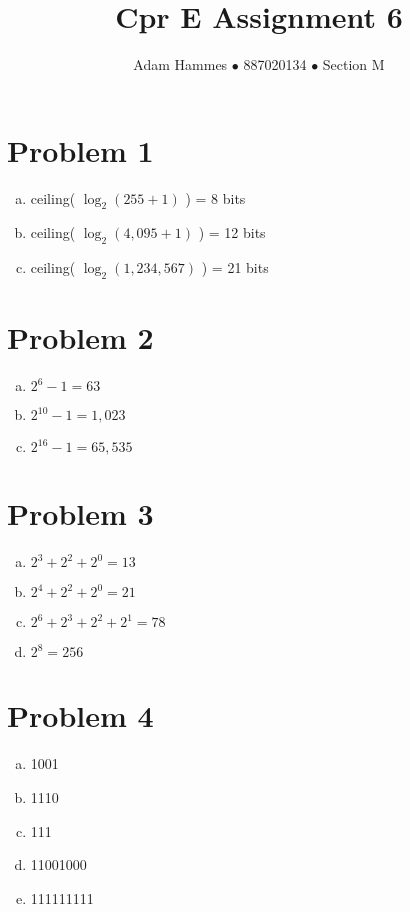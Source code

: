 \documentclass[11pt]{article}
\begin{document}
\title{Cpr E Assignment 6}
\author{Adam Hammes $\bullet$ 887020134 $\bullet$ Section M}
\maketitle

\section*{Problem 1}
\begin{enumerate}[(a)]
	\item ceiling( $\log _2 (255+1)$ ) = 8 bits
	\item ceiling( $\log _2 (4,095+1)$ ) = 12 bits
	\item ceiling( $\log _2 (1,234,567)$ ) = 21 bits
\end{enumerate}

\section*{Problem 2}
\begin{enumerate}[(a)]
	\item $2^6 -1 = 63$
	\item $2^{10} -1 = 1,023$
	\item $2^{16}-1 = 65,535$
\end{enumerate}

\section*{Problem 3}
\begin{enumerate}[(a)]
	\item $2^3+ 2^2+2^0=13$
	\item $2^4+2^2+2^0 =21$
	\item $2^6 + 2^3 + 2^2 +2^1 =78$
	\item $2^8 =256$
\end{enumerate}

\section*{Problem 4}
\begin{enumerate}[(a)]
	\item 1001
	\item 1110
	\item 111
	\item 11001000
	\item 111111111
\end{enumerate}
\end{document}
